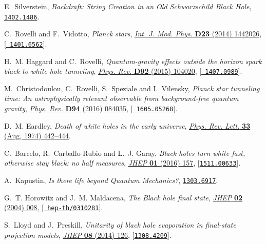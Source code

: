 \documentclass[10pt]{article}
\begin{document}
\begin{thebibliography}{100}
E.~Silverstein, \emph{{Backdraft: String Creation in an Old Schwarzschild Black
  Hole}},  \href{http://arxiv.org/abs/1402.1486}{{\tt 1402.1486}}.

C.~Rovelli and F.~Vidotto, \emph{{Planck stars}},
  \href{http://dx.doi.org/10.1142/S0218271814420267}{\emph{Int. J. Mod. Phys.}
  {\bf D23} (2014) 1442026}, [\href{http://arxiv.org/abs/1401.6562}{{\tt
  1401.6562}}].

H.~M. Haggard and C.~Rovelli, \emph{{Quantum-gravity effects outside the
  horizon spark black to white hole tunneling}},
  \href{http://dx.doi.org/10.1103/PhysRevD.92.104020}{\emph{Phys. Rev.} {\bf
  D92} (2015) 104020}, [\href{http://arxiv.org/abs/1407.0989}{{\tt
  1407.0989}}].

M.~Christodoulou, C.~Rovelli, S.~Speziale and I.~Vilensky, \emph{{Planck star
  tunneling time: An astrophysically relevant observable from background-free
  quantum gravity}},
  \href{http://dx.doi.org/10.1103/PhysRevD.94.084035}{\emph{Phys. Rev.} {\bf
  D94} (2016) 084035}, [\href{http://arxiv.org/abs/1605.05268}{{\tt
  1605.05268}}].

D.~M. Eardley, \emph{Death of white holes in the early universe},
  \href{http://dx.doi.org/10.1103/PhysRevLett.33.442}{\emph{Phys. Rev. Lett.}
  {\bf 33} (Aug, 1974) 442--444}.

C.~Barcelo, R.~Carballo-Rubio and L.~J. Garay, \emph{{Black holes turn white
  fast, otherwise stay black: no half measures}},
  \href{http://dx.doi.org/10.1007/JHEP01(2016)157}{\emph{JHEP} {\bf 01} (2016)
  157}, [\href{http://arxiv.org/abs/1511.00633}{{\tt 1511.00633}}].

A.~Kapustin, \emph{{Is there life beyond Quantum Mechanics?}},
  \href{http://arxiv.org/abs/1303.6917}{{\tt 1303.6917}}.

G.~T. Horowitz and J.~M. Maldacena, \emph{{The Black hole final state}},
  \href{http://dx.doi.org/10.1088/1126-6708/2004/02/008}{\emph{JHEP} {\bf 02}
  (2004) 008}, [\href{http://arxiv.org/abs/hep-th/0310281}{{\tt
  hep-th/0310281}}].

S.~Lloyd and J.~Preskill, \emph{{Unitarity of black hole evaporation in
  final-state projection models}},
  \href{http://dx.doi.org/10.1007/JHEP08(2014)126}{\emph{JHEP} {\bf 08} (2014)
  126}, [\href{http://arxiv.org/abs/1308.4209}{{\tt 1308.4209}}].


\end{thebibliography}
\end{document}
